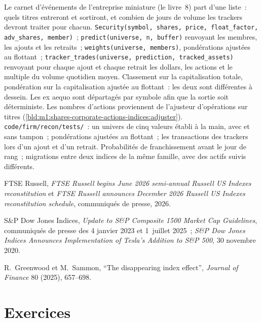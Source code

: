 \begin{build}
 Le carnet d'événements de l'entreprise miniature (le livre~8) part
d'une liste~: quels titres entreront et sortiront, et combien de jours de volume
les trackers devront traiter pour chacun.  \texttt{Security(symbol, shares, price, float\_factor,
adv\_shares, member)}~; \texttt{predict(universe, n, buffer)} renvoyant
les membres, les ajouts et les retraits~; \texttt{weights(universe, members)},
pondérations ajustées au flottant~; \texttt{tracker\_trades(universe, prediction,
tracked\_assets)} renvoyant pour chaque ajout et chaque retrait les dollars, les
actions et le multiple du volume quotidien moyen.
 Classement sur la capitalisation totale, pondération sur la capitalisation
ajustée au flottant~: les deux sont différentes à dessein. Les ex aequo sont départagés par symbole afin
que la sortie soit déterministe. Les nombres d'actions proviennent de l'ajusteur d'opérations sur
titres (\cref{bld:m1:shares-corporate-actions-indices:adjuster}).
 \texttt{code/firm/recon/tests/}~: un univers de cinq valeurs
établi à la main, avec et sans tampon~; pondérations ajustées au flottant~; les
transactions des trackers lors d'un ajout et d'un retrait.
 Probabilités de franchissement avant le jour de rang~; migrations
entre deux indices de la même famille, avec des actifs suivis différents.
\end{build}

\begin{omsources}
\item FTSE Russell, \emph{FTSE Russell begins June 2026 semi-annual Russell
US Indexes reconstitution} et \emph{FTSE Russell announces December 2026
Russell US Indexes reconstitution schedule}, communiqués de presse, 2026.
\item S\&P Dow Jones Indices, \emph{Update to S\&P Composite 1500 Market Cap
Guidelines}, communiqués de presse des 4 janvier 2023 et 1~juillet 2025~; \emph{S\&P Dow
Jones Indices Announces Implementation of Tesla's Addition to S\&P 500}, 30
novembre 2020.
\item R.~Greenwood et M.~Sammon, ``The disappearing index effect'',
\emph{Journal of Finance} 80 (2025), 657--698.
\end{omsources}

\section{Exercices}

